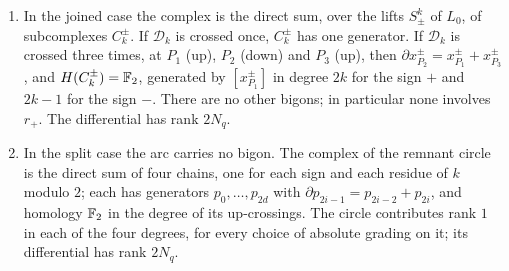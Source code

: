 \begin{proposition}\label{prop:bigonsP}
\begin{enumerate}
\item In the joined case the complex is the direct sum, over the lifts $S^k_\pm$ of $L_0$, of subcomplexes $C^\pm_k$. If $\mathcal D_k$ is
crossed once, $C^\pm_k$ has one generator. If $\mathcal D_k$ is crossed three times, at $P_1$ (up), $P_2$ (down) and $P_3$ (up),
then $\partial x^\pm_{P_2}=x^\pm_{P_1}+x^\pm_{P_3}$, and $H(C^\pm_k)=\mathbb{F}_2$, generated by $[x^\pm_{P_1}]$ in degree $2k$ for the sign $+$
and $2k-1$ for the sign $-$. There are no other bigons; in particular none involves $r_+$. The differential has rank $2N_q$.
\item In the split case the arc carries no bigon. The complex of the remnant circle is the direct sum of four chains,
one for each sign and each residue of $k$ modulo $2$; each has generators $p_0,\dots,p_{2d}$ with $\partial p_{2i-1}=p_{2i-2}+p_{2i}$, and homology
$\mathbb{F}_2$ in the degree of its up-crossings. The circle contributes rank $1$ in each of the four degrees, for every choice of
absolute grading on it; its differential has rank $2N_q$.
\end{enumerate}
\end{proposition}

